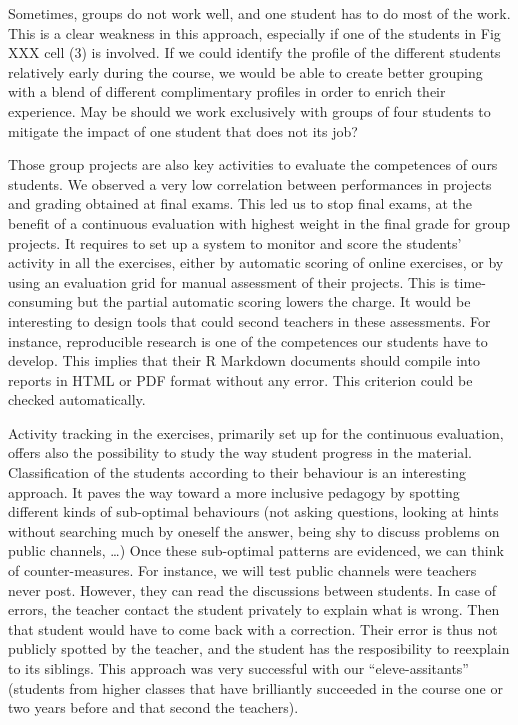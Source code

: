 \documentclass[
]{article}
\begin{document}
Sometimes, groups do not work well, and one student has to do most of
the work. This is a clear weakness in this approach, especially if one
of the students in Fig XXX cell (3) is involved. If we could identify
the profile of the different students relatively early during the
course, we would be able to create better grouping with a blend of
different complimentary profiles in order to enrich their experience.
May be should we work exclusively with groups of four students to
mitigate the impact of one student that does not its job?

Those group projects are also key activities to evaluate the competences
of ours students. We observed a very low correlation between
performances in projects and grading obtained at final exams. This led
us to stop final exams, at the benefit of a continuous evaluation with
highest weight in the final grade for group projects. It requires to set
up a system to monitor and score the students' activity in all the
exercises, either by automatic scoring of online exercises, or by using
an evaluation grid for manual assessment of their projects. This is
time-consuming but the partial automatic scoring lowers the charge. It
would be interesting to design tools that could second teachers in these
assessments. For instance, reproducible research is one of the
competences our students have to develop. This implies that their R
Markdown documents should compile into reports in HTML or PDF format
without any error. This criterion could be checked automatically.

Activity tracking in the exercises, primarily set up for the continuous
evaluation, offers also the possibility to study the way student
progress in the material. Classification of the students according to
their behaviour is an interesting approach. It paves the way toward a
more inclusive pedagogy by spotting different kinds of sub-optimal
behaviours (not asking questions, looking at hints without searching
much by oneself the answer, being shy to discuss problems on public
channels, \ldots) Once these sub-optimal patterns are evidenced, we can
think of counter-measures. For instance, we will test public channels
were teachers never post. However, they can read the discussions between
students. In case of errors, the teacher contact the student privately
to explain what is wrong. Then that student would have to come back with
a correction. Their error is thus not publicly spotted by the teacher,
and the student has the resposibility to reexplain to its siblings. This
approach was very successful with our ``eleve-assitants'' (students from
higher classes that have brilliantly succeeded in the course one or two
years before and that second the teachers).
\end{document}
